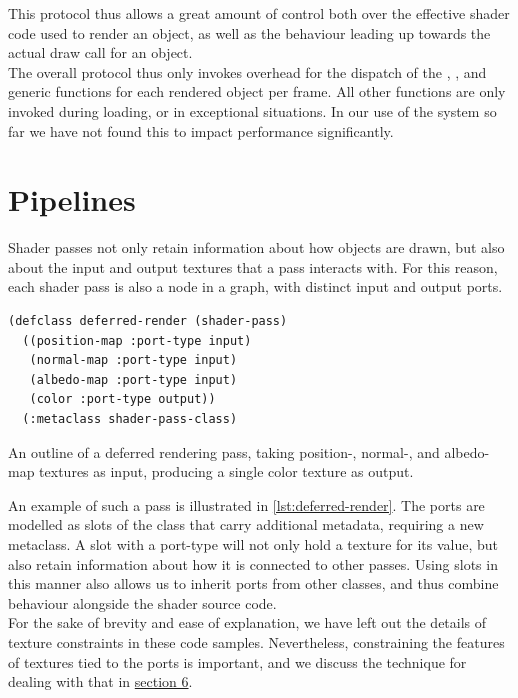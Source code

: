 \documentclass[format=sigconf]{acmart}
\begin{document}
This protocol thus allows a great amount of control both over the effective shader code used to render an object, as well as the behaviour leading up towards the actual draw call for an object. \\

The overall protocol thus only invokes overhead for the dispatch of the , , and  generic functions for each rendered object per frame. All other functions are only invoked during loading, or in exceptional situations. In our use of the system so far we have not found this to impact performance significantly.

\section{Pipelines}\label{pipelines}
Shader passes not only retain information about how objects are drawn, but also about the input and output textures that a pass interacts with. For this reason, each shader pass is also a node in a graph, with distinct input and output ports.

\begin{listing}[h]
\begin{verbatim}
(defclass deferred-render (shader-pass)
  ((position-map :port-type input)
   (normal-map :port-type input)
   (albedo-map :port-type input)
   (color :port-type output))
  (:metaclass shader-pass-class)
\end{verbatim}
\caption{An outline of a deferred rendering pass, taking position-, normal-, and albedo-map textures as input, producing a single color texture as output.}
\label{lst:deferred-render}
\end{listing}

An example of such a pass is illustrated in \autoref{lst:deferred-render}. The ports are modelled as slots of the class that carry additional metadata, requiring a new metaclass. A slot with a port-type will not only hold a texture for its value, but also retain information about how it is connected to other passes. Using slots in this manner also allows us to inherit ports from other classes, and thus combine behaviour alongside the shader source code. \\

For the sake of brevity and ease of explanation, we have left out the details of texture constraints in these code samples. Nevertheless, constraining the features of textures tied to the ports is important, and we discuss the technique for dealing with that in \hyperref[allocation]{section 6}. \\
\end{document}
